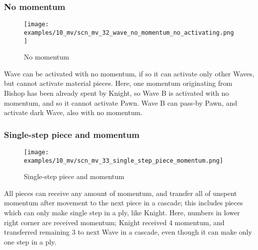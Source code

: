 \clearpage %

\subsubsection*{No momentum}
\label{sec:Miranda's veil/Wave/Cascading Waves/No momentum}

\vspace*{-1.4\baselineskip}
\noindent
\begin{figure}[h]
\texttt{[image: examples/10\_mv/scn\_mv\_32\_wave\_no\_momentum\_no\_activating.png]}
\caption{No momentum}
\label{fig:scn_mv_32_wave_no_momentum_no_activating}
\end{figure}

Wave can be activated with no momentum, if so it can activate only other Waves, but
cannot activate material pieces. Here, one momentum originating from Bishop has been
already spent by Knight, so Wave B is activated with no momentum, and so it cannot
activate Pawn. Wave B can pass-by Pawn, and activate dark Wave, also with no momentum.

\clearpage %

\subsubsection*{Single-step piece and momentum}
\label{sec:Miranda's veil/Wave/Cascading Waves/Single-step piece and momentum}

\vspace*{-1.5\baselineskip}
\noindent
\begin{figure}[h]
\texttt{[image: examples/10\_mv/scn\_mv\_33\_single\_step\_piece\_momentum.png]}
\vspace*{-1.4\baselineskip}
\caption{Single-step piece and momentum}
\label{fig:scn_mv_33_single_step_piece_momentum}
\end{figure}

\vspace*{-0.5\baselineskip}
All pieces can receive any amount of momentum, and transfer all of unspent momentum
after movement to the next piece in a cascade; this includes pieces which can only
make single step in a ply, like Knight. \newline
\indent
Here, numbers in lower right corner are received momentum; Knight received 4 momentum,
and transferred remaining 3 to next Wave in a cascade, even though it can make only one
step in a ply.

